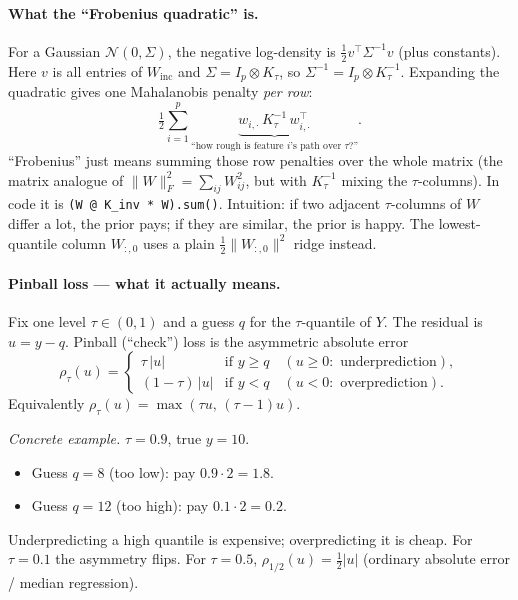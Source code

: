 \documentclass[11pt,a4paper]{article}
\theoremstyle{definition}
\newcommand{\Ncal}{\mathcal{N}}
\begin{document}
\paragraph{What the ``Frobenius quadratic'' is.}
For a Gaussian $\Ncal(0,\Sigma)$, the negative log-density is
$\tfrac12 v^\top\Sigma^{-1}v$ (plus constants). Here $v$ is all entries of
$W_{\mathrm{inc}}$ and $\Sigma=I_p\otimes K_\tau$, so
$\Sigma^{-1}=I_p\otimes K_\tau^{-1}$. Expanding the quadratic gives one
Mahalanobis penalty \emph{per row}:
\begin{equation}
  \tfrac12\sum_{i=1}^{p}
  \underbrace{
    w_{i,\cdot}\,K_\tau^{-1}\,w_{i,\cdot}^\top
  }_{\text{``how rough is feature $i$'s path over $\tau$?''}}.
\end{equation}
``Frobenius'' just means summing those row penalties over the whole matrix
(the matrix analogue of $\|W\|_F^2=\sum_{ij}W_{ij}^2$, but with $K_\tau^{-1}$
mixing the $\tau$-columns). In code it is
\texttt{(W @ K\_inv * W).sum()}. Intuition: if two adjacent $\tau$-columns of
$W$ differ a lot, the prior pays; if they are similar, the prior is happy.
The lowest-quantile column $W_{:,0}$ uses a plain $\tfrac12\|W_{:,0}\|^2$
ridge instead.

\paragraph{Pinball loss --- what it actually means.}
Fix one level $\tau\in(0,1)$ and a guess $q$ for the $\tau$-quantile of $Y$.
The residual is $u=y-q$. Pinball (``check'') loss is the asymmetric absolute
error
\begin{equation}
  \rho_\tau(u)
  =
  \begin{cases}
    \tau\,|u| & \text{if } y\ge q \quad (u\ge 0:\text{ underprediction}),\\
    (1-\tau)\,|u| & \text{if } y< q \quad (u<0:\text{ overprediction}).
  \end{cases}
\end{equation}
Equivalently $\rho_\tau(u)=\max(\tau u,\,(\tau-1)u)$.

\textit{Concrete example.} $\tau{=}0.9$, true $y{=}10$.
\begin{itemize}[leftmargin=1.2em,itemsep=0.1em]
  \item Guess $q{=}8$ (too low): pay $0.9\cdot 2=1.8$.
  \item Guess $q{=}12$ (too high): pay $0.1\cdot 2=0.2$.
\end{itemize}
Underpredicting a high quantile is expensive; overpredicting it is cheap.
For $\tau{=}0.1$ the asymmetry flips. For $\tau{=}0.5$,
$\rho_{1/2}(u)=\tfrac12|u|$ (ordinary absolute error / median regression).
\end{document}
